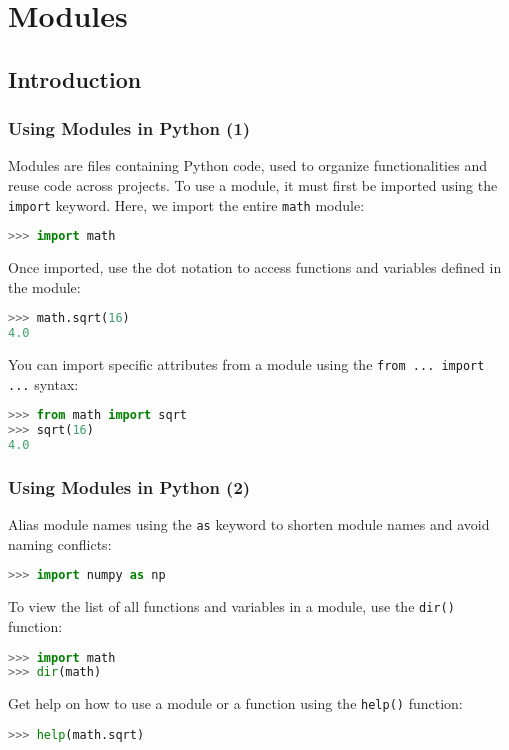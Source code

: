 \section{Modules}
\subsection*{Introduction}
\begin{frame}[fragile]
  \frametitle{Using Modules in Python (1)}
  Modules are files containing Python code, used to organize functionalities and reuse code across projects. To use a module, it must first be imported using the \lstinline{import} keyword. Here, we import the entire \lstinline{math} module:
  \begin{lstlisting}[language=Python, numbers=none]
>>> import math
  \end{lstlisting}\pause
  Once imported, use the dot notation to access functions and variables defined in the module:
  \begin{lstlisting}[language=Python, numbers=none]
>>> math.sqrt(16)
4.0
  \end{lstlisting}\pause
  You can import specific attributes from a module using the \lstinline{from ... import ...} syntax:
  \begin{lstlisting}[language=Python, numbers=none]
>>> from math import sqrt
>>> sqrt(16)
4.0
  \end{lstlisting}
\end{frame}

\begin{frame}[fragile]
  \frametitle{Using Modules in Python (2)}
  Alias module names using the \lstinline{as} keyword to shorten module names and avoid naming conflicts:
  \begin{lstlisting}[language=Python, numbers=none]
>>> import numpy as np
  \end{lstlisting}\pause
  To view the list of all functions and variables in a module, use the \lstinline{dir()} function:
  \begin{lstlisting}[language=Python, numbers=none]
>>> import math
>>> dir(math)
  \end{lstlisting}\pause
  Get help on how to use a module or a function using the \lstinline{help()} function:
  \begin{lstlisting}[language=Python, numbers=none]
>>> help(math.sqrt)
  \end{lstlisting}
\end{frame}

